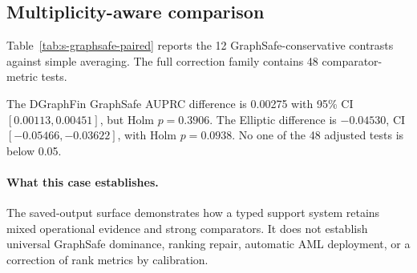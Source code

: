 \subsection{Multiplicity-aware comparison}

Table~\ref{tab:s-graphsafe-paired} reports the 12 GraphSafe-conservative contrasts against simple averaging. The full correction family contains 48 comparator-metric tests.



The DGraphFin GraphSafe AUPRC difference is 0.00275 with 95\% CI \([0.00113,0.00451]\), but Holm \(p=0.3906\). The Elliptic difference is \(-0.04530\), CI \([-0.05466,-0.03622]\), with Holm \(p=0.0938\). No one of the 48 adjusted tests is below 0.05.

\paragraph{What this case establishes.}
The saved-output surface demonstrates how a typed support system retains mixed operational evidence and strong comparators. It does not establish universal GraphSafe dominance, ranking repair, automatic AML deployment, or a correction of rank metrics by calibration.
